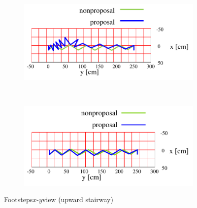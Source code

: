 \documentclass[autodetect-engine,dvipdfmx-if-dvi,ja=standard,a4j,jbase=11pt,magstyle=nomag*]{bxjsreport}
\begin{document}
\begin{figure}[pt]%
    \centering%
    \begin{subfigure}[c]{\linewidth}
        \centering%
        \includegraphics[width=0.9\linewidth, clip]{./figure/sim_hrp2_stair_upbad_xy.pdf}%
        \label{fig:sim_hrp2_stair_upbad_xy}%
    \end{subfigure}\\ %
    \vspace{25truemm}%
    \begin{subfigure}[c]{\linewidth}
        \centering%
        \includegraphics[width=0.9\linewidth, clip]{./figure/sim_hrp2_stair_up_xy.pdf}%
        \label{fig:sim_hrp2_stair_upgood_xy}%
    \end{subfigure}%
    \caption{Footsteps$x$-$y$view (upward stairway)}%
    \label{fig:sim_hrp2_stair_up_xy}%
\end{figure}
\end{document}
